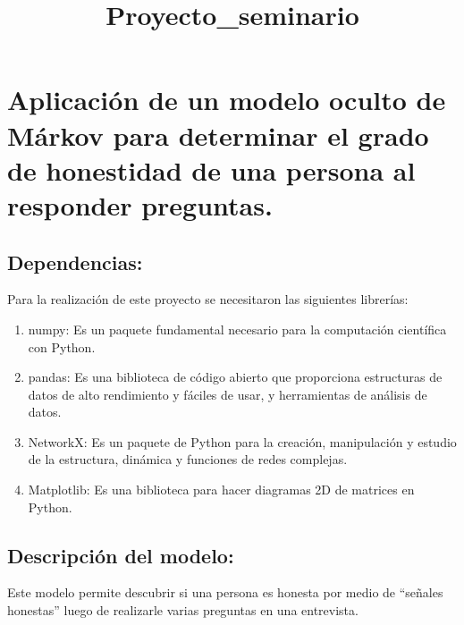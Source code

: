 \documentclass[11pt]{article}
\title{Proyecto\_seminario}
\providecommand{\tightlist}{%
      \setlength{\itemsep}{0pt}\setlength{\parskip}{0pt}}
\begin{document}
    
    
    \maketitle
    
    

    
    \hypertarget{aplicaciuxf3n-de-un-modelo-oculto-de-muxe1rkov-para-determinar-el-grado-de-honestidad-de-una-persona-al-responder-preguntas.}{%
\section{Aplicación de un modelo oculto de Márkov para determinar el
grado de honestidad de una persona al responder
preguntas.}\label{aplicaciuxf3n-de-un-modelo-oculto-de-muxe1rkov-para-determinar-el-grado-de-honestidad-de-una-persona-al-responder-preguntas.}}

    \hypertarget{dependencias}{%
\subsection{Dependencias:}\label{dependencias}}

Para la realización de este proyecto se necesitaron las siguientes
librerías:

\begin{enumerate}
\def\labelenumi{\arabic{enumi}.}
\tightlist
\item
  numpy: Es un paquete fundamental necesario para la computación
  científica con Python.
\item
  pandas: Es una biblioteca de código abierto que proporciona
  estructuras de datos de alto rendimiento y fáciles de usar, y
  herramientas de análisis de datos.
\item
  NetworkX: Es un paquete de Python para la creación, manipulación y
  estudio de la estructura, dinámica y funciones de redes complejas.
\item
  Matplotlib: Es una biblioteca para hacer diagramas 2D de matrices en
  Python.
\end{enumerate}

    \hypertarget{descripciuxf3n-del-modelo}{%
\subsection{Descripción del
modelo:}\label{descripciuxf3n-del-modelo}}

Este modelo permite descubrir si una persona es honesta por medio de
``señales honestas'' luego de realizarle varias preguntas en una
entrevista.
\end{document}
